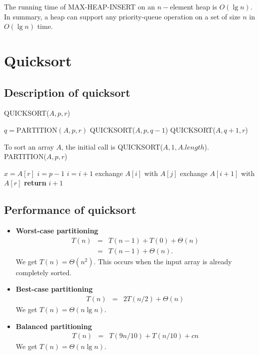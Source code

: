 \documentclass[12pt]{article}
\begin{document}
The running time of MAX-HEAP-INSERT on an $n-$element heap is $O(\lg n)$. \\

In summary, a heap can support any priority-queue operation on a set of size $n$ in $O(\lg n)$ time.

\section{Quicksort}

\subsection{Description of quicksort}

QUICKSORT($A, p, r$)
\begin{algorithmic}[1]
	\State $q = \text {PARTITION}(A, p, r)$
        \State QUICKSORT($A, p, q-1$)
        \State QUICKSORT($A, q+1, r$)
\EndIf
\end{algorithmic}

To sort an array $A$, the initial call is QUICKSORT($A, 1, A.length$). \\

PARTITION($A, p, r$)
\begin{algorithmic}[1]
\State $x = A[r]$
\State $i = p - 1$
        	\State $i = i + 1$
                \State exchange $A[i]$ with $A[j]$
        \EndIf
\EndFor
\State exchange $A[i+1]$ with $A[r]$
\State \textbf{return } $i+1$
\end{algorithmic}

\subsection{Performance of quicksort}

\begin{itemize}
  \item \textbf{Worst-case partitioning}
    \begin{eqnarray*}
      T(n)
      &=& T(n-1) + T(0) + \Theta(n) \\
      &=& T(n-1) + \Theta(n).
    \end{eqnarray*}
    We get $T(n) = \Theta (n^2)$. This occurs when the input array is already completely sorted.
  \item \textbf {Best-case partitioning}
    \begin{eqnarray*}
      T(n)
      &=& 2T(n/2) + \Theta(n)
    \end{eqnarray*}
    We get $T(n) = \Theta (n \lg n)$.
  \item \textbf {Balanced partitioning}
    \begin{eqnarray*}
      T(n)
      &=& T(9n/10) + T(n/10) + cn
    \end{eqnarray*}    
    We get $T(n) = \Theta (n \lg n)$.
\end{itemize}
\end{document}
